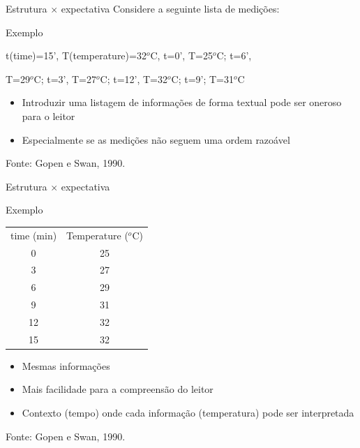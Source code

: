 \documentclass{beamer}
\begin{document}
\begin{frame}{Estrutura $\times$ expectativa}
  Considere a seguinte lista de medições:
  \begin{exampleblock}{Exemplo}
    \scriptsize
    \begin{center}
    t(time)=15', T(temperature)=32$^o$C, t=0', T=25$^o$C; t=6',

    T=29$^o$C; t=3', T=27$^o$C; t=12', T=32$^o$C; t=9'; T=31$^o$C
  \end{center}
  \end{exampleblock}

  \begin{itemize}
    \footnotesize
  \item Introduzir uma \alert{listagem} de informações de forma textual pode
    ser oneroso para o leitor
  \item Especialmente se as medições não seguem uma ordem razoável
  \end{itemize}
  \vfill
  \scriptsize
  \hfill Fonte: Gopen e Swan, 1990.
\end{frame}

\begin{frame}{Estrutura $\times$ expectativa}
  \begin{exampleblock}{Exemplo}
    \footnotesize
    \begin{center}
    \begin{tabular}{cc}
      time (min) & Temperature ($^o$C) \\
      0 & 25 \\
      3 & 27 \\
      6 & 29 \\
      9 & 31 \\
      12 & 32 \\
      15 & 32 \\
    \end{tabular}
  \end{center}
  \end{exampleblock}
  \begin{itemize}
    \footnotesize
  \item<1-> Mesmas informações
  \item Mais facilidade para a compreensão do leitor
  \item \alert{Contexto} (tempo) onde cada \alert{informação}
    (temperatura) pode ser interpretada
  \end{itemize}
  \vfill
  \scriptsize
  \hfill Fonte: Gopen e Swan, 1990.
\end{frame}
\end{document}
